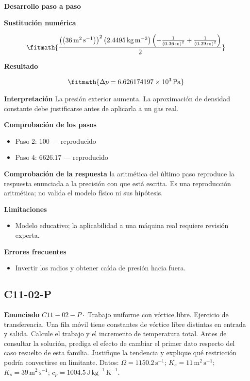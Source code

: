 \documentclass[10pt,openany]{book}
\begin{document}
\noindent\textbf{Desarrollo paso a paso}



\noindent\textbf{Sustitución numérica}

\[
\fitmath{\frac{\left(\left(36\,\mathrm{m}^{2}\,\mathrm{s}^{-1}\right)\right)^{2} \left(2.4495\,\mathrm{kg}\,\mathrm{m}^{-3}\right) \left(- \frac{1}{\left(0.36\,\mathrm{m}\right)^{2}} + \frac{1}{\left(0.29\,\mathrm{m}\right)^{2}}\right)}{2}}
\]

\noindent\textbf{Resultado}

\[
\fitmath{\Delta p=6.626174197\times10^{3}\,\mathrm{Pa}}
\]

\noindent\textbf{Interpretación}
La presión exterior aumenta. La aproximación de densidad constante debe justificarse antes de aplicarla a un gas real.

\noindent\textbf{Comprobación de los pasos}
\begin{itemize}
\item Paso 2: $100$ — reproducido
\item Paso 4: $6626.17$ — reproducido
\end{itemize}

\noindent\textbf{Comprobación de la respuesta} la aritmética del último paso reproduce la respuesta enunciada a la precisión con que está escrita. Es una reproducción aritmética; no valida el modelo físico ni sus hipótesis.

\noindent\textbf{Limitaciones}
\begin{itemize}
\item Modelo educativo; la aplicabilidad a una máquina real requiere revisión experta.
\end{itemize}

\noindent\textbf{Errores frecuentes}
\begin{itemize}
\item Invertir los radios y obtener caída de presión hacia fuera.
\end{itemize}
\subsection*{C11-02-P}

\noindent\textbf{Enunciado}
\(C11-02-P \cdot\) Trabajo uniforme con vórtice libre. Ejercicio de transferencia. Una fila móvil tiene constantes de vórtice libre distintas en entrada y salida. Calcule el trabajo y el incremento de temperatura total. Antes de consultar la solución, prediga el efecto de cambiar el primer dato respecto del caso resuelto de esta familia. Justifique la tendencia y explique qué restricción podría convertirse en limitante. Datos: \(\Omega=1150.2\, \mathrm{s}^{-1}\); \(K_e=11\, \mathrm{m}^{2}\,\mathrm{s}^{-1}\); \(K_s=39\, \mathrm{m}^{2}\,\mathrm{s}^{-1}\); \(c_p=1004.5\, \mathrm{J}\,\mathrm{kg}^{-1}\,\mathrm{K}^{-1}\).
\end{document}
